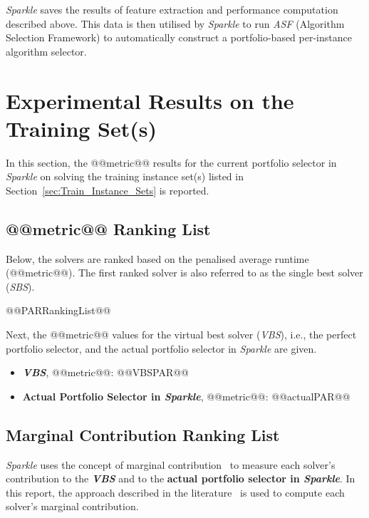 \documentclass[british]{article}
\begin{document}
\emph{Sparkle} saves the results of feature extraction and performance computation described above. This data is then utilised by \emph{Sparkle} to run \emph{ASF} (Algorithm Selection Framework) to automatically construct a portfolio-based per-instance algorithm selector.

\section{Experimental Results on the Training Set(s)}
\label{sec:Experimental_Results_Train}

In this section, the @@metric@@ results for the current portfolio selector in \emph{Sparkle} on solving the training instance set(s) listed in Section~\ref{sec:Train_Instance_Sets} is reported.

\subsection{@@metric@@ Ranking List}
\label{sec:PAR_Ranking}

Below, the solvers are ranked based on the penalised average runtime (@@metric@@). The first ranked solver is also referred to as the single best solver (\emph{SBS}).

\begin{enumerate}
@@PARRankingList@@
\end{enumerate}

Next, the @@metric@@ values for the virtual best solver (\emph{VBS}), i.e., the perfect portfolio selector, and the actual portfolio selector in \emph{Sparkle} are given.

\begin{itemize}
\item \textbf{\emph{VBS}}, @@metric@@: @@VBSPAR@@
\item \textbf{Actual Portfolio Selector in \emph{Sparkle}}, @@metric@@: @@actualPAR@@
\end{itemize}

\subsection{Marginal Contribution Ranking List}
\label{sec:Marginal_Contribution_Ranking}

\emph{Sparkle} uses the concept of marginal contribution~\cite{XuEtAl12} to measure each solver's contribution to the \textbf{\emph{VBS}} and to the \textbf{actual portfolio selector in \emph{Sparkle}}. In this report, the approach described in the literature~\cite{FreEtAl16} is used to compute each solver's marginal contribution.
\end{document}
